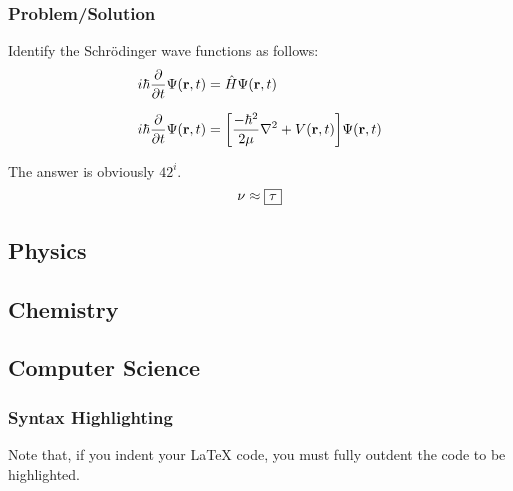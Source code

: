 \documentclass{homework}
\begin{document}
		\subsubsection{Problem/Solution}

		\begin{problem}
			Identify the Schrödinger wave functions as follows:
			\begin{align}
				i \hbar \pdv{t}\Psi(\vb{r},t) &= \hat{H}\Psi(\vb{r},t) \\[1.5ex]
				i \hbar \pdv{t} \Psi\qty(\vb{r},t) &= \qty[\frac{-\hbar^2}{2\mu}\laplacian + V\qty(\vb{r},t)]\Psi(\vb{r},t)
			\end{align}
		\end{problem}
		\begin{solution}
			The answer is obviously \(42^i\).
			\[
				\nu \approx \boxed{\tau}
			\]
		\end{solution}

		\subsection{Physics}

		\subsection{Chemistry}



		\subsection{Computer Science}
		\subsubsection{Syntax Highlighting}

		Note that, if you indent your \LaTeX{} code, you must fully outdent the code to be highlighted.
\end{document}
